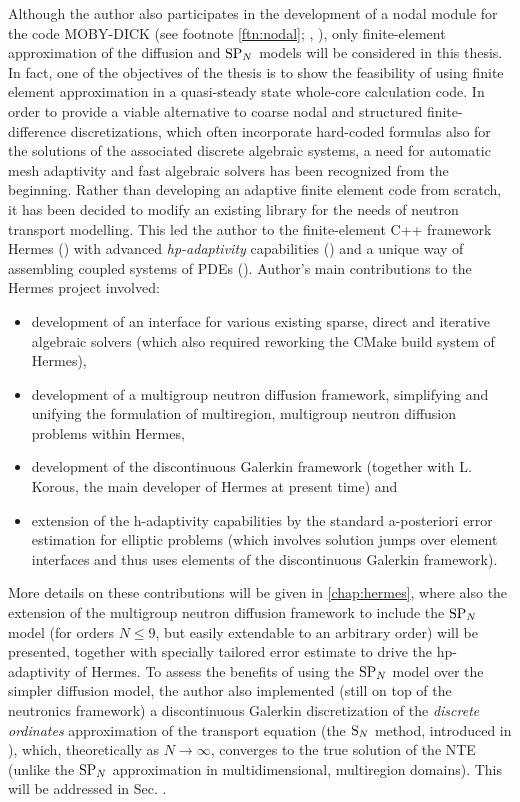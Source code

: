 Although the author also participates in the development of a nodal module for the code MOBY-DICK (see footnote
\ref{ftn:nodal}; \cite{Hanus2}, \cite[Chap. 4]{Hanus3}), only finite-element approximation of the diffusion and
 $\text{SP}_{N}$ models will be considered in this thesis. In fact, one of the objectives of the thesis is to show the
feasibility of using finite element approximation in a quasi-steady state whole-core calculation code. In order to
provide a viable alternative to coarse nodal and structured finite-difference discretizations, which often incorporate
hard-coded formulas also for the solutions of the associated discrete algebraic systems, a need for automatic mesh
adaptivity and fast algebraic solvers has been recognized from the beginning. Rather than developing an adaptive finite
element code from scratch, it has been decided to modify an existing library for the needs of neutron transport
modelling. This led the author to the finite-element C++ framework Hermes (\cite{Hermes-project}) with advanced
\textit{hp-adaptivity} capabilities (\cite{Hermes-hanging-nodes}) and a unique way of assembling coupled systems of PDEs (\cite{Hermes-thermoelasticity}).
Author's main contributions to the Hermes project involved:
\begin{itemize}
    \item development of an interface for various existing sparse,
direct and iterative algebraic solvers (which also required reworking the CMake build system of Hermes),
	\item development of a multigroup neutron diffusion framework, simplifying and unifying the formulation of
	multiregion, multigroup neutron diffusion problems within Hermes,
	\item development of the discontinuous Galerkin framework (together with L. Korous, the main developer of Hermes at
	present time) and
	\item extension of the h-adaptivity capabilities by the standard a-posteriori error estimation for elliptic problems (which
involves solution jumps over element interfaces and thus uses elements of the discontinuous Galerkin framework). 
\end{itemize}
More details on these contributions will be given in \cref{chap:hermes}, where also the extension of the multigroup
neutron diffusion framework to include the $\text{SP}_{N}$ model (for orders $N \leq 9$, but easily extendable to an arbitrary
order) will be presented, together with specially tailored error estimate to drive the hp-adaptivity of Hermes. To
assess the benefits of using the $\text{SP}_{N}$ model over the simpler diffusion model, the author also implemented (still on
top of the neutronics framework) a discontinuous Galerkin discretization of the \textit{discrete ordinates}
approximation of the transport equation (the $\text{S}_{N}$ method, introduced in ), which, theoretically as $N\to\infty$, converges to the true solution of
the NTE (unlike the $\text{SP}_{N}$ approximation in multidimensional, multiregion domains). This will be addressed in Sec.
.

